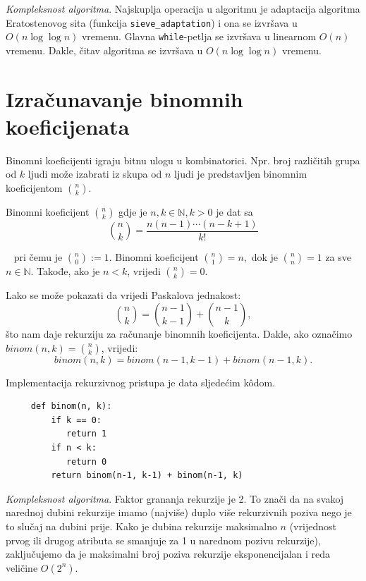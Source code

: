 \textit{Kompleksnost algoritma}. Najskuplja operacija u algoritmu je adaptacija algoritma Eratostenovog sita (funkcija \texttt{sieve\_adaptation}) i ona se izvršava u $O(n \log \log n)$ vremenu. Glavna \texttt{while}-petlja se izvršava u linearnom $O(n)$ vremenu. Dakle, čitav algoritma se izvršava u 
 $O(n \log \log n)$ vremenu.
 
  \section{Izračunavanje binomnih koeficijenata} 
  
  Binomni koeficijenti igraju bitnu ulogu u kombinatorici. Npr. broj različitih grupa od $k$ ljudi može izabrati iz skupa od $n$ ljudi je predstavljen binomnim koeficijentom $\binom{n}{k}$. 
  
  \begin{definition}
  	 Binomni koeficijent $\binom{n}{k}$ gdje je $n, k \in \mathbb{N}, k > 0$  je dat sa 
  	 $$\binom{n}{k} = \frac{n(n-1) \cdots (n-k+1)}{k!}$$
  \end{definition}
  
~ pri čemu je $\binom{n}{0} := 1$. Binomni koeficijent $\binom{n}{1} = n,$ dok je $\binom{n}{n} = 1$ za sve $n \in \mathbb{N}.$ Takođe, ako je $n <k$, vrijedi $\binom{n}{k}=0$.
 
  Lako se može pokazati da vrijedi Paskalova jednakost:
  $$ \binom{n}{k} = \binom{n-1}{k-1} + \binom{n-1}{k},$$
   što nam daje rekurziju za računanje binomnih koeficijenta. Dakle, ako označimo $binom(n, k) = \binom{n}{k}$, vrijedi:
   $$ binom(n, k)= binom(n-1, k-1) + binom(n-1, k).$$
   
   Implementacija rekurzivnog pristupa je data sljedećim k\^odom.
   
   \begin{verbatim}
     def binom(n, k): 
         if k == 0:
            return 1
         if n < k:
            return 0
         return binom(n-1, k-1) + binom(n-1, k)
   \end{verbatim}
  \textit{Kompleksnost algoritma}. Faktor grananja rekurzije je 2. To znači da na svakoj narednoj dubini rekurzije imamo (najviše) duplo više rekurzivnih poziva nego je to slučaj na dubini prije.  Kako je dubina rekurzije maksimalno $n$ (vrijednost prvog ili drugog atributa se smanjuje za 1 u narednom pozivu rekurzije), zaključujemo da je maksimalni broj poziva rekurzije eksponencijalan i reda veličine $O(2^n)$. \\
  
